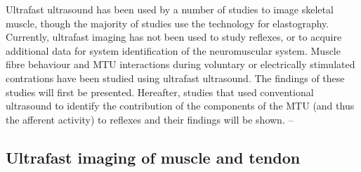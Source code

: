 Ultrafast ultrasound has been used by a number of studies to image skeletal muscle, though the majority of studies use the technology for elastography. Currently, ultrafast imaging has not been used to study reflexes, or to acquire additional data for system identification of the neuromuscular system. Muscle fibre behaviour and MTU interactions during voluntary or electrically stimulated contrations have been studied using ultrafast ultrasound. The findings of these studies will first be presented. 
Hereafter, studies that used conventional ultrasound to identify the contribution of the components of the MTU (and thus the afferent activity) to reflexes and their findings will be shown.  -- %


\subsection{Ultrafast imaging of muscle and tendon}
\label{sec:ufus_muscle_tendon}

